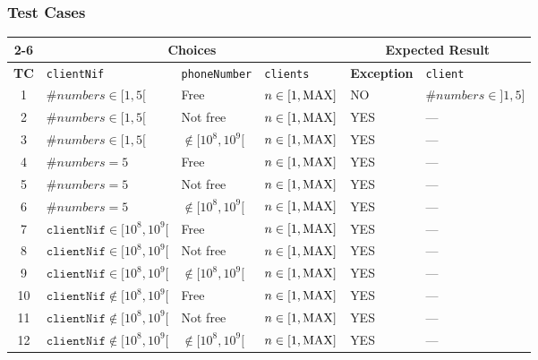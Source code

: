 \subsubsection{Test Cases}
\label{sec:methods.assignPhoneNumber.tests}
\begin{table}[!hbtp]
  \centering
  \normalsize
  \begin{tabular}{|c|l|l|l|l|l|}
    \cline{2-6}
    \multicolumn{1}{}{}
      & \multicolumn{3}{|c}{\textbf{Choices}}
      & \multicolumn{2}{|c|}{\textbf{Expected Result}} \\
    \hline
    \textbf{TC}
      & \texttt{clientNif} & \texttt{phoneNumber} & \texttt{clients}
      & \textbf{Exception} & \texttt{client} \\
    \hline
     1 & $\#numbers \in [1,5[$ & Free & $n \in [1,\rm{MAX}]$
       & NO & $\#numbers \in ]1,5]$ \\ \hline
     2 & $\#numbers \in [1,5[$ & Not free & $n \in [1,\rm{MAX}]$
       & YES & --- \\ \hline
     3 & $\#numbers \in [1,5[$ & $\notin [10^8,10^9[$ & $n \in [1,\rm{MAX}]$
       & YES & --- \\ \hline

     4 & $\#numbers = 5$ & Free & $n \in [1,\rm{MAX}]$
       & YES & --- \\ \hline
     5 & $\#numbers = 5$ & Not free & $n \in [1,\rm{MAX}]$
       & YES & --- \\ \hline
     6 & $\#numbers = 5$ & $\notin [10^8,10^9[$ & $n \in [1,\rm{MAX}]$
       & YES & --- \\ \hline

     7 & $\texttt{clientNif} \in [10^8,10^9[$ & Free & $n \in [1,\rm{MAX}]$
       & YES & --- \\ \hline
     8 & $\texttt{clientNif} \in [10^8,10^9[$ & Not free
         & $n \in [1,\rm{MAX}]$
       & YES & --- \\ \hline
     9 & $\texttt{clientNif} \in [10^8,10^9[$
         & $\notin [10^8,10^9[$ & $n \in [1,\rm{MAX}]$
       & YES & --- \\ \hline
     
    10 & $\texttt{clientNif} \notin [10^8,10^9[$ & Free & $n \in [1,\rm{MAX}]$
       & YES & --- \\ \hline
    11 & $\texttt{clientNif} \notin [10^8,10^9[$ & Not free
         & $n \in [1,\rm{MAX}]$
       & YES & --- \\ \hline
    12 & $\texttt{clientNif} \notin [10^8,10^9[$
         & $\notin [10^8,10^9[$ & $n \in [1,\rm{MAX}]$
       & YES & --- \\ \hline
  \end{tabular}
\end{table}